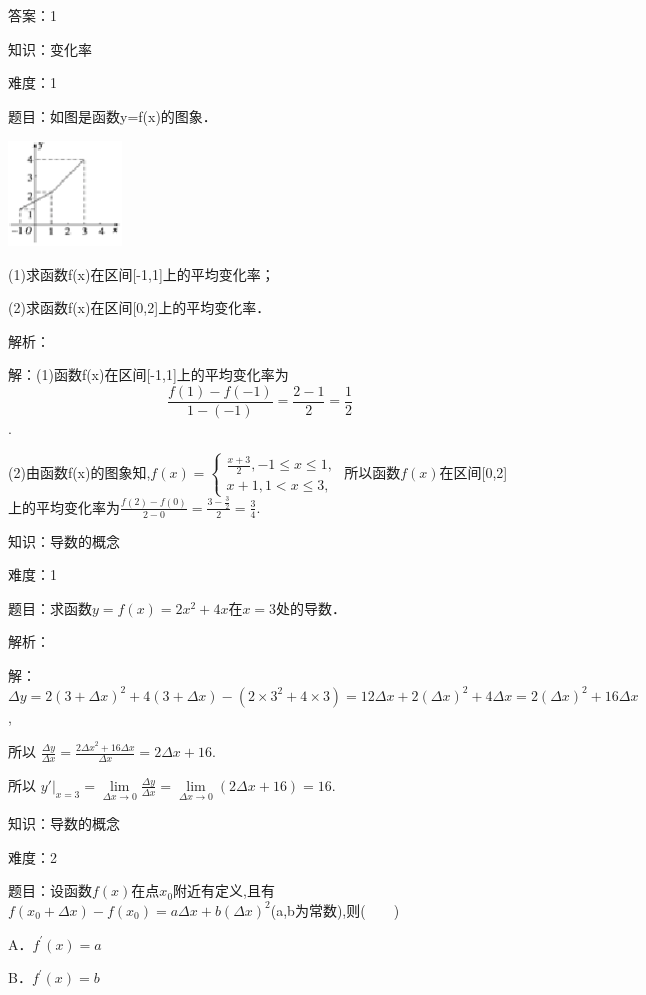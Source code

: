 \documentclass{article} %
\begin{document}
答案：1



知识：变化率

难度：1

题目：如图是函数y=f(x)的图象．

\includegraphics*[width=1.19in, height=1.10in, keepaspectratio=false]{image21}

(1)求函数f(x)在区间[-1,1]上的平均变化率；

(2)求函数f(x)在区间[0,2]上的平均变化率．

解析：

解：(1)函数f(x)在区间[-1,1]上的平均变化率为$$\frac{f(1)-f(-1)}{1-(-1)}=\frac{2-1}{2}=\frac{1}{2}$$.

(2)由函数f(x)的图象知,$
f(x)=
\begin{cases}
\frac{x+3}{2},-1\le x\le 1,\\
x+1,1<x\le3,
\end{cases}$
所以函数$f(x)$在区间[0,2]上的平均变化率为$\frac{f(2)-f(0)}{2-0}=\frac{3-\frac{3}{2}}{2}=\frac{3}{4}$.



知识：导数的概念

难度：1

题目：求函数$y=f(x)=2x^{2}+4x$在$x=3$处的导数．

解析：

解：$\Delta y=2(3+\Delta  x)^{2}+4(3+\Delta x)-(2{\times}3^{2}+4{\times}3)=
12\Delta x+2(\Delta x)^{2}+4\Delta x=2(\Delta x)^{2}+16\Delta x$,

所以 $\frac{\Delta y}{\Delta x}=\frac{2{\Delta x}^2+16\Delta x}{\Delta x}=2\Delta x+16$.

所以 $y'|_{x=3}=\lim\limits_{\Delta x\rightarrow 0}\frac{\Delta y}{\Delta x} =\lim\limits_{\Delta x\rightarrow 0} (2\Delta x+16)=16$.



知识：导数的概念

难度：2

题目：设函数$f(x)$在点$x_{0}$附近有定义,且有$f(x_{0}+\Delta x)-f(x_{0})=a\Delta x+b(\Delta x)^{2}$(a,b为常数),则(　　)

A．$f^{'}(x)=a$   

B．$f^{'}(x)=b$
\end{document}
